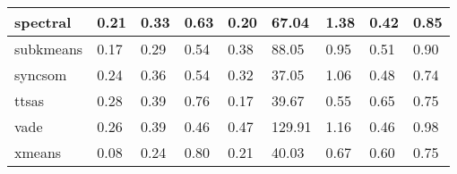 \begin{table}[H]
\begin{tabular}{|l|l|l|l|l|l|l|l|l|}
\hline
spectral & 0.21 & 0.33 & 0.63 & 0.20 & 67.04 & 1.38 & 0.42 & 0.85 \\
\hline
subkmeans & 0.17 & 0.29 & 0.54 & 0.38 & 88.05 & 0.95 & 0.51 & 0.90 \\
\hline
syncsom & 0.24 & 0.36 & 0.54 & 0.32 & 37.05 & 1.06 & 0.48 & 0.74 \\
\hline
ttsas & 0.28 & 0.39 & 0.76 & 0.17 & 39.67 & 0.55 & 0.65 & 0.75 \\
\hline
vade & 0.26 & 0.39 & 0.46 & 0.47 & 129.91 & 1.16 & 0.46 & 0.98 \\
\hline
xmeans & 0.08 & 0.24 & 0.80 & 0.21 & 40.03 & 0.67 & 0.60 & 0.75 \\
\hline
\end{tabular}
\end{table}



